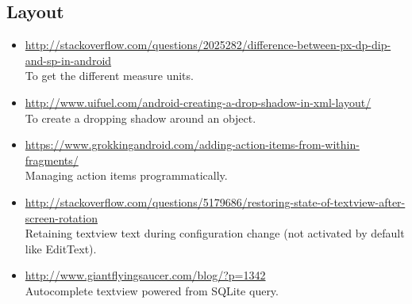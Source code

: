 \subsection{Layout}

\begin{itemize}
	\item \url{http://stackoverflow.com/questions/2025282/difference-between-px-dp-dip-and-sp-in-android} \\To get the different measure units.
	\item \url{http://www.uifuel.com/android-creating-a-drop-shadow-in-xml-layout/} \\To create a dropping shadow around an object.
	\item \url{https://www.grokkingandroid.com/adding-action-items-from-within-fragments/} \\Managing action items programmatically.
	\item \url{http://stackoverflow.com/questions/5179686/restoring-state-of-textview-after-screen-rotation} \\Retaining textview text during configuration change (not activated by default like EditText).
	\item \url{http://www.giantflyingsaucer.com/blog/?p=1342} \\Autocomplete textview powered from SQLite query.
\end{itemize}

